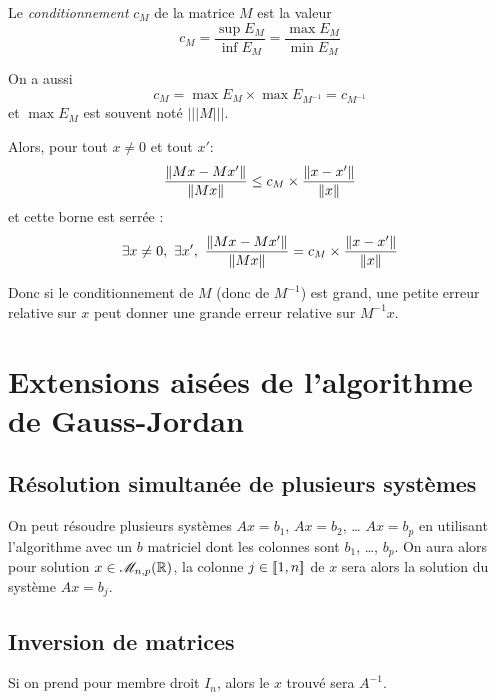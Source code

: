 Le \emph{conditionnement} $c_{M}$ de la matrice $M$ est la valeur
\begin{equation*}
  c_{M} = \frac{\sup E_{M}}{\inf E_{M}} = \frac{\max E_{M}}{\min E_{M}}
\end{equation*}
\begin{rem}
On a aussi
\begin{equation*}
  c_{M} = \max E_{M}\times \max E_{M^{-1}} = c_{M^{-1}}
\end{equation*}
et $\max E_{M}$ est souvent noté $\lvert\lvert\lvert M \rvert\rvert\rvert$.
\end{rem}
Alors, pour tout $x\neq 0$ et tout $x'$:
\begin{equation*}
  \frac{\left\Vert {Mx-Mx'}\right\Vert}{\left\Vert {Mx}\right\Vert} \leq c_{M}\times \frac{\left\Vert {x-x'}\right\Vert}{\left\Vert {x}\right\Vert}
\end{equation*}
et cette borne est serrée :
\begin{equation*}
  \exists x\neq 0,~  \exists x' ,~
  \frac{\left\Vert {Mx-Mx'}\right\Vert}{\left\Vert {Mx}\right\Vert} = c_{M}\times \frac{\left\Vert {x-x'}\right\Vert}{\left\Vert {x}\right\Vert}
\end{equation*}

Donc si le conditionnement de $M$ (donc de $M^{-1}$) est grand, une
petite erreur relative sur $x$ peut donner une grande erreur relative
sur $M^{-1}x$.

\section{Extensions aisées de l'algorithme de Gauss-Jordan}

\subsection{Résolution simultanée de plusieurs systèmes}

On peut résoudre plusieurs systèmes $Ax = b_{1}$, $Ax=b_{2}$,
  \ldots{} $Ax = b_{p}$ en utilisant l'algorithme avec un $b$ matriciel
  dont les colonnes sont $b_{1}$, \ldots{}, $b_{p}$. 
  On aura alors pour solution $x\in \mathscr{M}_{n,p}(\mathbb{R})$, la colonne $j\in[\![1,n]\!]$ de $x$ sera alors la solution du système $Ax = b_j$.
  
\subsection{Inversion de matrices}  
Si on prend pour membre droit $I_{n}$, alors le $x$ trouvé sera $A^{-1}$.

